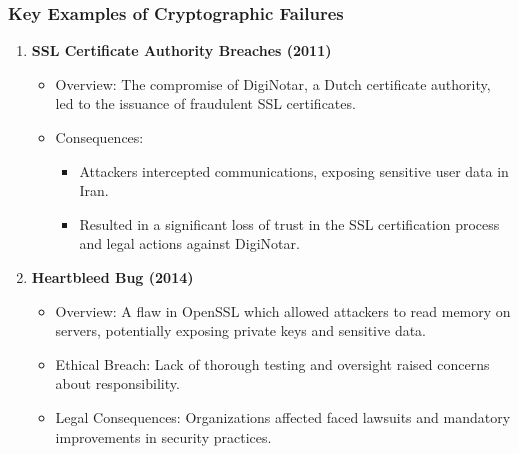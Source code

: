 \documentclass{beamer}
\begin{document}
\begin{frame}[fragile]
    \frametitle{Key Examples of Cryptographic Failures}

    \begin{enumerate}
        \item \textbf{SSL Certificate Authority Breaches (2011)}
        \begin{itemize}
            \item Overview: The compromise of DigiNotar, a Dutch certificate authority, led to the issuance of fraudulent SSL certificates.
            \item Consequences:
            \begin{itemize}
                \item Attackers intercepted communications, exposing sensitive user data in Iran.
                \item Resulted in a significant loss of trust in the SSL certification process and legal actions against DigiNotar.
            \end{itemize}
        \end{itemize}
        
        \item \textbf{Heartbleed Bug (2014)}
        \begin{itemize}
            \item Overview: A flaw in OpenSSL which allowed attackers to read memory on servers, potentially exposing private keys and sensitive data.
            \item Ethical Breach: Lack of thorough testing and oversight raised concerns about responsibility.
            \item Legal Consequences: Organizations affected faced lawsuits and mandatory improvements in security practices.
        \end{itemize}
    \end{enumerate}
\end{frame}
\end{document}
